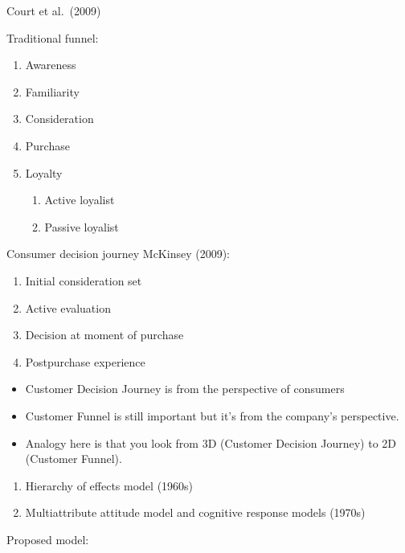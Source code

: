 \documentclass[
]{book}
\providecommand{\tightlist}{%
  \setlength{\itemsep}{0pt}\setlength{\parskip}{0pt}}
\begin{document}
Court et al.~(2009)

Traditional funnel:

\begin{enumerate}
\def\labelenumi{\arabic{enumi}.}
\item
  Awareness
\item
  Familiarity
\item
  Consideration
\item
  Purchase
\item
  Loyalty

  \begin{enumerate}
  \def\labelenumii{\arabic{enumii}.}
  \item
    Active loyalist
  \item
    Passive loyalist
  \end{enumerate}
\end{enumerate}

Consumer decision journey McKinsey (2009):

\begin{enumerate}
\def\labelenumi{\arabic{enumi}.}
\tightlist
\item
  Initial consideration set
\item
  Active evaluation
\item
  Decision at moment of purchase
\item
  Postpurchase experience
\end{enumerate}

\begin{itemize}
\item
  Customer Decision Journey is from the perspective of consumers
\item
  Customer Funnel is still important but it's from the company's perspective.
\item
  Analogy here is that you look from 3D (Customer Decision Journey) to 2D (Customer Funnel).
\end{itemize}

\citep{maclnnis1989}

\begin{enumerate}
\def\labelenumi{\arabic{enumi}.}
\item
  Hierarchy of effects model (1960s)
\item
  Multiattribute attitude model and cognitive response models (1970s)
\end{enumerate}

Proposed model:
\end{document}
